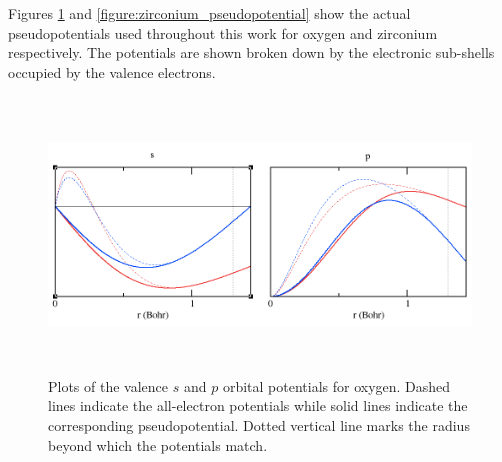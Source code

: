 Figures \ref{figure:oxygen_pseudopotential} and \ref{figure:zirconium_pseudopotential} show the actual pseudopotentials used throughout this work for oxygen and zirconium respectively. The potentials are shown broken down by the electronic sub-shells occupied by the valence electrons.

\begin{figure} %
\label{figure:oxygen_pseudopotential}
\begin{center}
\includegraphics[height=7.3cm]{images/oxygen_otf_pp.png}
\end{center}
\caption{Plots of the valence $s$ and $p$ orbital potentials for oxygen. Dashed lines indicate the all-electron potentials while solid lines indicate the corresponding pseudopotential. Dotted vertical line marks the radius beyond which the potentials match.}
\end{figure}



